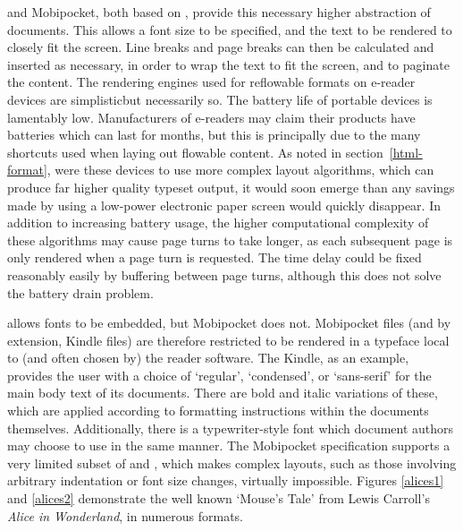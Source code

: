 \epub{} and Mobipocket, both based on \html{}, provide this necessary higher abstraction of
documents. This allows a font size to be specified, and the text to be rendered to closely fit the
screen. Line breaks and page breaks can then be calculated and inserted as necessary, in order to
wrap the text to fit the screen, and to paginate the content. The rendering engines used for
reflowable formats on e-reader devices are simplistic\ed but necessarily so. The battery life of
portable devices is lamentably low. Manufacturers of e-readers may claim their products have
batteries which can last for months, but this is principally due to the many shortcuts used when
laying out flowable content. As noted in section~\ref{html-format}, were these devices to use more
complex layout algorithms, which can produce far higher quality typeset output, it would soon emerge
than any savings made by using a low-power electronic paper screen would quickly disappear. In
addition to increasing battery usage, the higher computational complexity of these algorithms may
cause page turns to take longer, as each subsequent page is only rendered when a page turn is
requested. The time delay could be fixed reasonably easily by buffering between page turns, although
this does not solve the battery drain problem.







\epub{} allows fonts to be embedded, but Mobipocket does not. Mobipocket files (and by extension,
Kindle files) are therefore restricted to be rendered in a typeface local to (and often chosen by)
the reader software. The Kindle, as an example, provides the user with a choice of `regular',
`condensed', or `sans-serif' for the main body text of its documents. There are bold and italic
variations of these, which are applied according to formatting instructions within the documents
themselves. Additionally, there is a typewriter-style font which document authors may choose to use
in the same manner. The Mobipocket specification supports a very limited subset of \html{} and
\css{}, which makes complex layouts, such as those involving arbitrary indentation or font size
changes, virtually impossible. Figures \ref{alices1} and \ref{alices2} demonstrate the well known
`Mouse's Tale' from Lewis Carroll's \emph{Alice in Wonderland}, in numerous formats.


